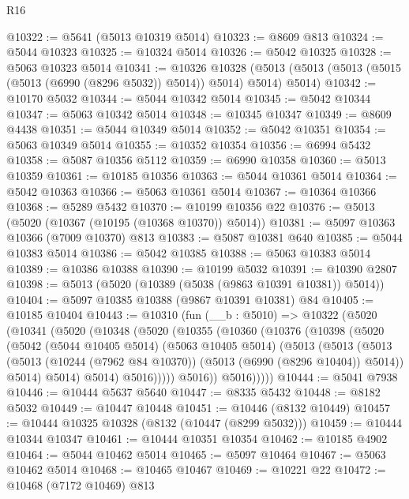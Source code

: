 \begin{lexlean}{R16}
\begin{coremodule}
@10322 := @5641 (@5013 @10319 @5014)
@10323 := @8609 @813
@10324 := @5044 @10323
@10325 := @10324 @5014
@10326 := @5042 @10325
@10328 := @5063 @10323 @5014
@10341 := @10326
    @10328
    (@5013 (@5013 (@5013 (@5015 (@5013 (@6990 (@8296 @5032)) @5014)) @5014) @5014) @5014)
@10342 := @10170 @5032
@10344 := @5044 @10342 @5014
@10345 := @5042 @10344
@10347 := @5063 @10342 @5014
@10348 := @10345 @10347
@10349 := @8609 @4438
@10351 := @5044 @10349 @5014
@10352 := @5042 @10351
@10354 := @5063 @10349 @5014
@10355 := @10352 @10354
@10356 := @6994 @5432
@10358 := @5087 @10356 @5112
@10359 := @6990 @10358
@10360 := @5013 @10359
@10361 := @10185 @10356
@10363 := @5044 @10361 @5014
@10364 := @5042 @10363
@10366 := @5063 @10361 @5014
@10367 := @10364 @10366
@10368 := @5289 @5432
@10370 := @10199 @10356 @22
@10376 := @5013 (@5020 (@10367 (@10195 (@10368 @10370)) @5014))
@10381 := @5097 @10363 @10366 (@7009 @10370) @813
@10383 := @5087 @10381 @640
@10385 := @5044 @10383 @5014
@10386 := @5042 @10385
@10388 := @5063 @10383 @5014
@10389 := @10386 @10388
@10390 := @10199 @5032
@10391 := @10390 @2807
@10398 := @5013 (@5020 (@10389 (@5038 (@9863 @10391 @10381)) @5014))
@10404 := @5097 @10385 @10388 (@9867 @10391 @10381) @84
@10405 := @10185 @10404
@10443 := @10310
    (fun (__b : @5010) =>
    @10322
      (@5020
        (@10341
          (@5020
            (@10348
              (@5020
                (@10355
                  (@10360
                    (@10376
                      (@10398
                        (@5020
                          (@5042
                            (@5044 @10405 @5014)
                            (@5063 @10405 @5014)
                            (@5013
                              (@5013
                                (@5013
                                  (@5013
                                    (@10244 (@7962 @84 @10370))
                                    (@5013 (@6990 (@8296 @10404)) @5014))
                                  @5014)
                                @5014)
                              @5014)
                            @5016)))))
                  @5016))
              @5016)))))
@10444 := @5041 @7938
@10446 := @10444 @5637 @5640
@10447 := @8335 @5432
@10448 := @8182 @5032
@10449 := @10447 @10448
@10451 := @10446 (@8132 @10449)
@10457 := @10444 @10325 @10328 (@8132 (@10447 (@8299 @5032)))
@10459 := @10444 @10344 @10347
@10461 := @10444 @10351 @10354
@10462 := @10185 @4902
@10464 := @5044 @10462 @5014
@10465 := @5097 @10464
@10467 := @5063 @10462 @5014
@10468 := @10465 @10467
@10469 := @10221 @22
@10472 := @10468 (@7172 @10469) @813

\end{coremodule}
\end{lexlean}
